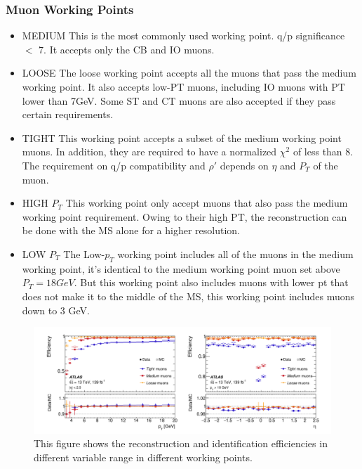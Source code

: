 \subsubsection*{Muon Working Points}
\begin{itemize}

\item MEDIUM \newline
This is the most commonly used working point. q/p significance $<$ 7. It accepts only the CB and IO muons.  

\item LOOSE \newline
    The loose working point accepts all the muons that pass the medium working point. It also accepts low-PT muons, including IO muons with PT lower than 7GeV. Some ST and CT muons are also accepted if they pass certain requirements. 

\item TIGHT \newline
    This working point accepts a subset of the medium working point muons. In addition, they are required to have a normalized $\chi^{2}$ of less than 8. The requirement on q/p compatibility and $\rho'$ depends on $\eta$ and $P_{T}$ of the muon.

\item HIGH $P_{T}$ \newline
This working point only accept muons that also pass the medium working point requirement. Owing to their high PT, the reconstruction can be done with the MS alone for a higher resolution.


\item LOW $P_{T}$ \newline
The Low-$p_{T}$ working point includes all of the muons in the medium working point, it's identical to the medium working point muon set above $P_{T}=18GeV$. But this working point also includes muons with lower pt that does not make it to the middle of the MS, this working point includes muons down to 3 GeV. 

\end{itemize}

\begin{figure}[!htb]
    \begin{center}
        \includegraphics[width=1\textwidth]{figures/common_ana/IdentificationEff}
        \caption{
            This figure shows the reconstruction and identification efficiencies in different variable range in different working points\cite{Aad:2746302}.
    }
        \label{fig:isolationWP}
    \end{center}
\end{figure}



